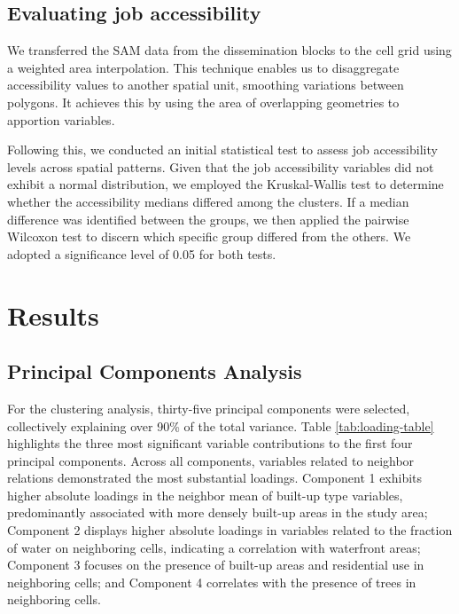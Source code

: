 \documentclass[conference,final,]{IEEEtran}
\begin{document}
\hypertarget{evaluating-job-accessibility}{%
\subsection{Evaluating job
accessibility}\label{evaluating-job-accessibility}}

We transferred the SAM data from the dissemination blocks to the cell
grid using a weighted area interpolation. This technique enables us to
disaggregate accessibility values to another spatial unit, smoothing
variations between polygons. It achieves this by using the area of
overlapping geometries to apportion variables.

Following this, we conducted an initial statistical test to assess job
accessibility levels across spatial patterns. Given that the job
accessibility variables did not exhibit a normal distribution, we
employed the Kruskal-Wallis test to determine whether the accessibility
medians differed among the clusters. If a median difference was
identified between the groups, we then applied the pairwise Wilcoxon
test to discern which specific group differed from the others. We
adopted a significance level of 0.05 for both tests.

\hypertarget{results}{%
\section{Results}\label{results}}

\hypertarget{principal-components-analysis}{%
\subsection{Principal Components
Analysis}\label{principal-components-analysis}}

For the clustering analysis, thirty-five principal components were
selected, collectively explaining over 90\% of the total variance. Table
\ref{tab:loading-table} highlights the three most significant variable
contributions to the first four principal components. Across all
components, variables related to neighbor relations demonstrated the
most substantial loadings. Component 1 exhibits higher absolute loadings
in the neighbor mean of built-up type variables, predominantly
associated with more densely built-up areas in the study area; Component
2 displays higher absolute loadings in variables related to the fraction
of water on neighboring cells, indicating a correlation with waterfront
areas; Component 3 focuses on the presence of built-up areas and
residential use in neighboring cells; and Component 4 correlates with
the presence of trees in neighboring cells.
\end{document}
